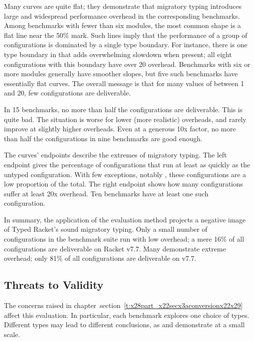 \documentclass[ twoside,open=right,titlepage,numbers=noenddot,headinclude,%
                footinclude=true,cleardoublepage=empty,abstract=off,
                BCOR=5mm,paper=a4,fontsize=11pt,%
                ngerman,american,%
                parts,pdfspacing]{scrreprt}
\newcommand{\SecRef}[2]{section~#1}
\newcommand{\SecRefLocal}[3]{\hyperref[#1]{\SecRef{#2}{#3}}}
\newcommand{\Ssubsubsection}[2]{\subsubsection[#1]{#2}}
\renewcommand{\Ssubsubsection}[2]{\subsection[#1]{#2}}
\renewcommand{\SecRefLocal}[3]{section~\ref{#1}}
\begin{document}
Many curves are quite flat; they demonstrate that migratory typing introduces
 large and widespread performance overhead in the corresponding benchmarks.
Among benchmarks with fewer than six modules, the
 most common shape is a flat line near the 50\% mark.
Such lines imply that the performance of a group of configurations is
 dominated by a single type boundary.
For instance, there is one type boundary in  that adds overwhelming
 slowdown when present; all eight configurations with this boundary have over
 20 overhead.
Benchmarks with six or more modules generally have
 smoother slopes, but five such benchmarks have essentially flat curves.
The overall message is that for many values of  between 1 and
 20, few configurations are deliverable.

In 15 benchmarks, no more than half the configurations
 are deliverable.
This is quite bad.
The situation is worse for lower (more realistic) overheads, and rarely
 improve at slightly higher overheads.
Even at a generous 10x factor, no more than half the configurations in
 nine benchmarks are good enough.

The curves{'} endpoints describe the extremes of migratory typing.
The left endpoint gives the percentage of configurations that run at least
 as quickly as the untyped configuration.
With few exceptions, notably , these configurations are a low proportion of the total.
The right endpoint shows how many configurations suffer at least 20x overhead.
Ten benchmarks have at least one such configuration.

In summary, the application of the evaluation method projects a negative
 image of Typed Racket{'}s sound migratory typing.
Only a small number of configurations in the benchmark suite run with low
 overhead; a mere 16\% of all configurations are deliverable on
 Racket v7.7.
Many demonstrate extreme overhead; only 81\% of all configurations are
 deliverable on v7.7.

\Ssubsubsection{Threats to Validity}{Threats to Validity}\label{t:x28part_x22secx3atrx3athreatsx22x29}

The concerns raised in chapter~\SecRefLocal{t:x28part_x22secx3aconversionx22x29}{3.4.1}{From Programs to Benchmarks} affect this evaluation.
In particular, each benchmark explores one choice of types.
Different types may lead to different conclusions, as  and
  demonstrate at a small scale.
\end{document}
